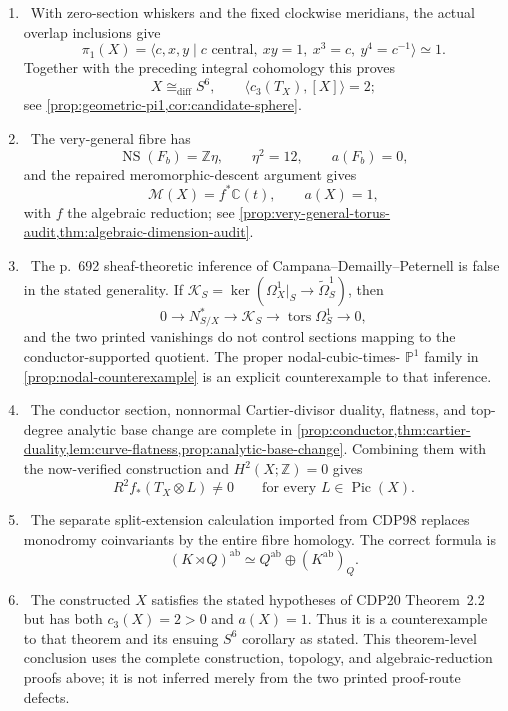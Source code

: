 \begin{enumerate}[leftmargin=1.8em]
\item \Verified\ With zero-section whiskers and the fixed clockwise
meridians, the actual overlap inclusions give
\[
 \pi_1(X)=
 \langle c,x,y\mid c\text{ central},\ xy=1,\ x^3=c,\ y^4=c^{-1}\rangle
 \simeq1.
\]
Together with the preceding integral cohomology this proves
\[
 X\cong_{\mathrm{diff}}S^6,\qquad
 \langle c_3(T_X),[X]\rangle=2;
\]
see \cref{prop:geometric-pi1,cor:candidate-sphere}.

\item \Verified\ The very-general fibre has
\[
 \operatorname{NS}(F_b)=\mathbb Z\eta,\qquad \eta^2=12,
 \qquad a(F_b)=0,
\]
and the repaired meromorphic-descent argument gives
\[
 \mathcal M(X)=f^*\mathbb C(t),\qquad a(X)=1,
\]
with \(f\) the algebraic reduction; see
\cref{prop:very-general-torus-audit,thm:algebraic-dimension-audit}.

\item \Refuted\ The p.~692 sheaf-theoretic inference of
Campana--Demailly--Peternell is false in the stated generality.  If
\(
\mathscr K_S=\ker(\Omega_X^1|_S\to\widetilde\Omega_S^1)
\), then
\[
0\longrightarrow N^*_{S/X}\longrightarrow\mathscr K_S
\longrightarrow\operatorname{tors}\Omega_S^1\longrightarrow0,
\]
and the two printed vanishings do not control sections mapping to the
conductor-supported quotient.  The proper nodal-cubic-times-
\(\mathbb P^1\) family in \cref{prop:nodal-counterexample} is an explicit
counterexample to that inference.

\item \Verified\ The conductor section, nonnormal Cartier-divisor duality,
flatness, and top-degree analytic base change are complete in
\cref{prop:conductor,thm:cartier-duality,lem:curve-flatness,prop:analytic-base-change}.
Combining them with the now-verified construction and \(H^2(X;\mathbb Z)=0\)
gives
\[
 R^2f_*(T_X\otimes L)\ne0
 \qquad\text{for every }L\in\operatorname{Pic}(X).
\]

\item \Refuted\ The separate split-extension calculation imported from
CDP98 replaces monodromy coinvariants by the entire fibre homology.  The
correct formula is
\[
 (K\rtimes Q)^{\mathrm{ab}}
 \simeq Q^{\mathrm{ab}}\oplus(K^{\mathrm{ab}})_Q.
\]

\item \Verified\ The constructed \(X\) satisfies the stated hypotheses of
CDP20 Theorem~2.2 but has both \(c_3(X)=2>0\) and \(a(X)=1\).  Thus it is a
counterexample to that theorem and its ensuing \(S^6\) corollary as stated.
This theorem-level conclusion uses the complete construction, topology, and
algebraic-reduction proofs above; it is not inferred merely from the two
printed proof-route defects.


\end{enumerate}
